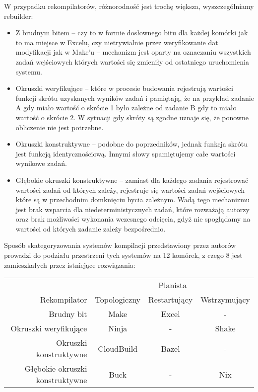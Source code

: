 W przypadku rekompilatorów, różnorodność jest trochę większa, wyszczególniamy rebuilder:
\begin{itemize}
\item Z brudnym bitem -- czy to w formie dosłownego bitu dla każdej komórki jak to ma miejsce w Excelu, czy nietrywialnie przez weryfikowanie dat modyfikacji jak w Make'u -- mechanizm jest oparty na oznaczaniu wszystkich zadań wejściowych których wartości się zmieniły od ostatniego uruchomienia systemu.
\item Okruszki weryfikujące -- które w procesie budowania rejestrują wartości funkcji skrótu uzyskanych wyników zadań i pamiętają, że na przykład zadanie A gdy miało wartość o skrócie 1 było zależne od zadanie B gdy to miało wartość o skrócie 2. W sytuacji gdy skróty są zgodne uznaje się, że ponowne obliczenie nie jest potrzebne.
\item Okruszki konstruktywne -- podobne do poprzedników, jednak funkcja skrótu jest funkcją identycznościową. Innymi słowy spamiętujemy całe wartości wynikowe zadań.
\item Głębokie okruszki konstruktywne -- zamiast dla każdego zadania rejestrować wartości zadań od których zależy, rejestruje się wartości zadań wejściowych które są w przechodnim domknięciu bycia zależnym. Wadą tego mechanizmu jest brak wsparcia dla niedeterministycznych zadań, które rozważają autorzy oraz brak możliwości wykonania wczesnego odcięcia, gdyż nie spoglądamy na wartości od których zadanie zależy bezpośrednio.
\end{itemize}

Sposób skategoryzowania systemów kompilacji przedstawiony przez autorów prowadzi do podziału przestrzeni tych systemów na 12 komórek, z czego 8 jest zamieszkałych przez istniejące rozwiązania:

\begin{tabular}{r | c c c}
\hline
                                & \multicolumn{3}{c}{Planista} \\
Rekompilator                    & Topologiczny & Restartujący & Wstrzymujący \\
\hline
Brudny bit                      & Make         & Excel        & - \\
Okruszki weryfikujące           & Ninja        & -            & Shake \\
Okruszki konstruktywne          & CloudBuild   & Bazel        & -\\
Głębokie okruszki konstruktywne & Buck         & -            & Nix \\
\hline
\end{tabular}

